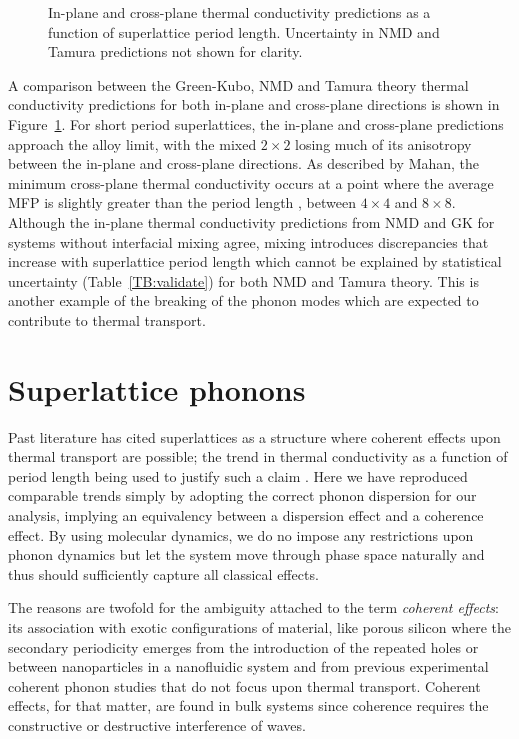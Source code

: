 \documentclass[aps,prb,preprint,preprintnumbers,amsmath,amssymb,floatfix,superscriptaddress]{revtex4}
\begin{document}
\begin{figure}%
\begin{center}
\renewcommand{\figure}{Fig.}
\caption{In-plane and cross-plane thermal conductivity predictions as a function of superlattice period length. Uncertainty in NMD and Tamura predictions not shown for clarity.}
\label{FIG:NMD_v_GK}
\end{center}
\end{figure}

A comparison between the Green-Kubo, NMD and Tamura theory thermal conductivity predictions for both in-plane and cross-plane directions is shown in Figure~\ref{FIG:NMD_v_GK}. For short period superlattices, the in-plane and cross-plane predictions approach the alloy limit, with the mixed $2\times 2$ losing much of its anisotropy between the in-plane and cross-plane directions. As described by Mahan, the minimum cross-plane thermal conductivity occurs at a point where the average MFP is slightly greater than the period length \cite{PhysRevLett.84.927}, between $4 \times 4$ and $8 \times 8$. Although the in-plane thermal conductivity predictions from NMD and GK for systems without interfacial mixing agree, mixing introduces discrepancies that increase with superlattice period length which cannot be explained by statistical uncertainty (Table~\ref{TB:validate}) for both NMD and Tamura theory. This is another example of the breaking of the phonon modes which are expected to contribute to thermal transport.

\section{Superlattice phonons}

Past literature has cited superlattices as a structure where coherent effects upon thermal transport are possible; the trend in thermal conductivity as a function of period length being used to justify such a claim \cite{PhysRevB.67.195311,PhysRevB.72.174302,PhysRevB.61.3091}. Here we have reproduced comparable trends simply by adopting the correct phonon dispersion for our analysis, implying an equivalency between a dispersion effect and a coherence effect. By using molecular dynamics, we do no impose any restrictions upon phonon dynamics but let the system move through phase space naturally and thus should sufficiently capture all classical effects.

The reasons are twofold for the ambiguity attached to the term \textit {coherent effects}: its association with exotic configurations of material, like porous silicon \cite{doi:10.1021/nl102918q} where the secondary periodicity emerges from the introduction of the repeated holes or between nanoparticles in a nanofluidic system \cite{Keblinski2002855} and from previous experimental coherent phonon studies \cite{PhysRevLett.73.740,PhysRevB.75.195309} that do not focus upon thermal transport. Coherent effects, for that matter, are found in bulk systems since coherence requires the constructive or destructive interference of waves.
\end{document}
